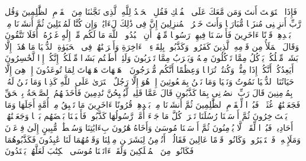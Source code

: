 \startbuffer[\q:23:28]
فَإِذَا ٱسۡتَوَیۡتَ أَنتَ وَمَن مَّعَكَ عَلَى ٱلۡفُلۡكِ فَقُلِ ٱلۡحَمۡدُ لِلَّهِ ٱلَّذِی نَجَّىٰنَا مِنَ ٱلۡقَوۡمِ ٱلظَّٰلِمِینَ%
\stopbuffer
\startbuffer[\q:23:29]
وَقُل رَّبِّ أَنزِلۡنِی مُنزَلࣰا مُّبَارَكࣰا وَأَنتَ خَیۡرُ ٱلۡمُنزِلِینَ%
\stopbuffer
\startbuffer[\q:23:30]
إِنَّ فِی ذَٰلِكَ لَءَایَٰتࣲ وَإِن كُنَّا لَمُبۡتَلِینَ%
\stopbuffer
\startbuffer[\q:23:31]
ثُمَّ أَنشَأۡنَا مِنۢ بَعۡدِهِمۡ قَرۡنًا ءَاخَرِینَ%
\stopbuffer
\startbuffer[\q:23:32]
فَأَرۡسَلۡنَا فِیهِمۡ رَسُولࣰا مِّنۡهُمۡ أَنِ ٱعۡبُدُوا۟ ٱللَّهَ مَا لَكُم مِّنۡ إِلَٰهٍ غَیۡرُهُۥۤۚ أَفَلَا تَتَّقُونَ%
\stopbuffer
\startbuffer[\q:23:33]
وَقَالَ ٱلۡمَلَأُ مِن قَوۡمِهِ ٱلَّذِینَ كَفَرُوا۟ وَكَذَّبُوا۟ بِلِقَاۤءِ ٱلۡءَاخِرَةِ وَأَتۡرَفۡنَٰهُمۡ فِی ٱلۡحَیَوٰةِ ٱلدُّنۡیَا مَا هَٰذَاۤ إِلَّا بَشَرࣱ مِّثۡلُكُمۡ یَأۡكُلُ مِمَّا تَأۡكُلُونَ مِنۡهُ وَیَشۡرَبُ مِمَّا تَشۡرَبُونَ%
\stopbuffer
\startbuffer[\q:23:34]
وَلَئِنۡ أَطَعۡتُم بَشَرࣰا مِّثۡلَكُمۡ إِنَّكُمۡ إِذࣰا لَّخَٰسِرُونَ%
\stopbuffer
\startbuffer[\q:23:35]
أَیَعِدُكُمۡ أَنَّكُمۡ إِذَا مِتُّمۡ وَكُنتُمۡ تُرَابࣰا وَعِظَٰمًا أَنَّكُم مُّخۡرَجُونَ%
\stopbuffer
\startbuffer[\q:23:36]
۞ هَیۡهَاتَ هَیۡهَاتَ لِمَا تُوعَدُونَ%
\stopbuffer
\startbuffer[\q:23:37]
إِنۡ هِیَ إِلَّا حَیَاتُنَا ٱلدُّنۡیَا نَمُوتُ وَنَحۡیَا وَمَا نَحۡنُ بِمَبۡعُوثِینَ%
\stopbuffer
\startbuffer[\q:23:38]
إِنۡ هُوَ إِلَّا رَجُلٌ ٱفۡتَرَىٰ عَلَى ٱللَّهِ كَذِبࣰا وَمَا نَحۡنُ لَهُۥ بِمُؤۡمِنِینَ%
\stopbuffer
\startbuffer[\q:23:39]
قَالَ رَبِّ ٱنصُرۡنِی بِمَا كَذَّبُونِ%
\stopbuffer
\startbuffer[\q:23:40]
قَالَ عَمَّا قَلِیلࣲ لَّیُصۡبِحُنَّ نَٰدِمِینَ%
\stopbuffer
\startbuffer[\q:23:41]
فَأَخَذَتۡهُمُ ٱلصَّیۡحَةُ بِٱلۡحَقِّ فَجَعَلۡنَٰهُمۡ غُثَاۤءࣰۚ فَبُعۡدࣰا لِّلۡقَوۡمِ ٱلظَّٰلِمِینَ%
\stopbuffer
\startbuffer[\q:23:42]
ثُمَّ أَنشَأۡنَا مِنۢ بَعۡدِهِمۡ قُرُونًا ءَاخَرِینَ%
\stopbuffer
\startbuffer[\q:23:43]
مَا تَسۡبِقُ مِنۡ أُمَّةٍ أَجَلَهَا وَمَا یَسۡتَءۡخِرُونَ%
\stopbuffer
\startbuffer[\q:23:44]
ثُمَّ أَرۡسَلۡنَا رُسُلَنَا تَتۡرَاۖ كُلَّ مَا جَاۤءَ أُمَّةࣰ رَّسُولُهَا كَذَّبُوهُۖ فَأَتۡبَعۡنَا بَعۡضَهُم بَعۡضࣰا وَجَعَلۡنَٰهُمۡ أَحَادِیثَۚ فَبُعۡدࣰا لِّقَوۡمࣲ لَّا یُؤۡمِنُونَ%
\stopbuffer
\startbuffer[\q:23:45]
ثُمَّ أَرۡسَلۡنَا مُوسَىٰ وَأَخَاهُ هَٰرُونَ بِءَایَٰتِنَا وَسُلۡطَٰنࣲ مُّبِینٍ%
\stopbuffer
\startbuffer[\q:23:46]
إِلَىٰ فِرۡعَوۡنَ وَمَلَإِی۟هِۦ فَٱسۡتَكۡبَرُوا۟ وَكَانُوا۟ قَوۡمًا عَالِینَ%
\stopbuffer
\startbuffer[\q:23:47]
فَقَالُوۤا۟ أَنُؤۡمِنُ لِبَشَرَیۡنِ مِثۡلِنَا وَقَوۡمُهُمَا لَنَا عَٰبِدُونَ%
\stopbuffer
\startbuffer[\q:23:48]
فَكَذَّبُوهُمَا فَكَانُوا۟ مِنَ ٱلۡمُهۡلَكِینَ%
\stopbuffer
\startbuffer[\q:23:49]
وَلَقَدۡ ءَاتَیۡنَا مُوسَى ٱلۡكِتَٰبَ لَعَلَّهُمۡ یَهۡتَدُونَ%

